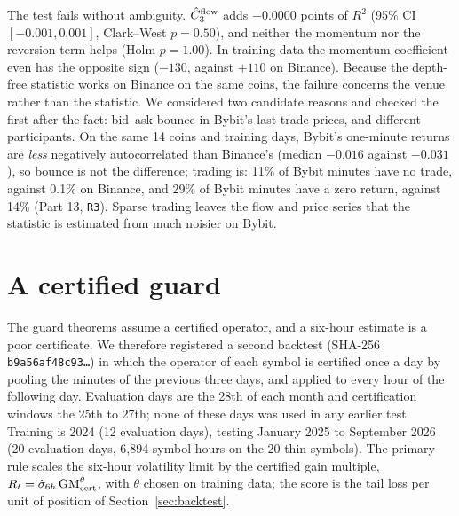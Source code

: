\documentclass[12pt]{article}
\theoremstyle{definition}
\theoremstyle{remark}
\begin{document}
The test fails without ambiguity. $\hat C_3^{\rm flow}$ adds $-0.0000$ points of $R^2$ (95\% CI $[-0.001,0.001]$, Clark--West $p=0.50$), and neither the momentum nor the reversion term helps (Holm $p=1.00$). In training data the momentum coefficient even has the opposite sign ($-130$, against $+110$ on Binance). Because the depth-free statistic works on Binance on the same coins, the failure concerns the venue rather than the statistic. We considered two candidate reasons and checked the first after the fact: bid--ask bounce in Bybit's last-trade prices, and different participants. On the same 14 coins and training days, Bybit's one-minute returns are \emph{less} negatively autocorrelated than Binance's (median $-0.016$ against $-0.031$), so bounce is not the difference; trading is: 11\% of Bybit minutes have no trade, against 0.1\% on Binance, and 29\% of Bybit minutes have a zero return, against 14\% (Part 13, \texttt{R3}). Sparse trading leaves the flow and price series that the statistic is estimated from much noisier on Bybit.


\section{A certified guard}
The guard theorems assume a certified operator, and a six-hour estimate is a poor certificate. We therefore registered a second backtest (SHA-256 \texttt{b9a56af48c93\ldots}) in which the operator of each symbol is certified once a day by pooling the minutes of the previous three days, and applied to every hour of the following day. Evaluation days are the 28th of each month and certification windows the 25th to 27th; none of these days was used in any earlier test. Training is 2024 (12 evaluation days), testing January 2025 to September 2026 (20 evaluation days, 6{,}894 symbol-hours on the 20 thin symbols). The primary rule scales the six-hour volatility limit by the certified gain multiple, $R_t=\hat\sigma_{6h}\,{\rm GM}_{\rm cert}^{\theta}$, with $\theta$ chosen on training data; the score is the tail loss per unit of position of Section~\ref{sec:backtest}.
\end{document}
